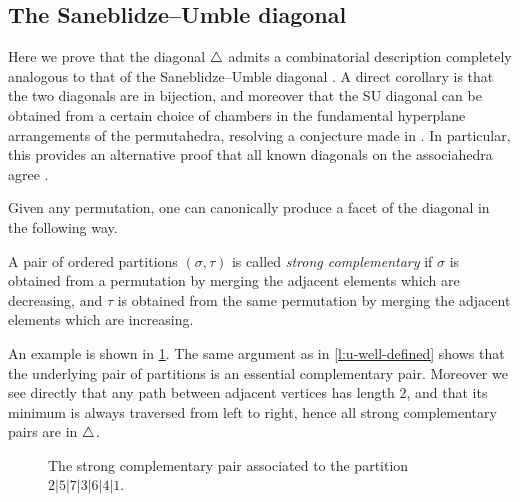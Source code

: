 \subsection{The Saneblidze--Umble diagonal}


Here we prove that the diagonal $\triangle$ admits a combinatorial description completely analogous to that of the Saneblidze--Umble diagonal \cite{SaneblidzeUmble04}. 
A direct corollary is that the two diagonals are in bijection, and moreover that the SU diagonal can be obtained from a certain choice of chambers in the fundamental hyperplane arrangements of the permutahedra, resolving a conjecture made in \cite{LA21}.
In particular, this provides an alternative proof that all known diagonals on the associahedra agree \cite{saneblidzeComparingDiagonalsAssociahedra2022}.

Given any permutation, one can canonically produce a facet of the diagonal in the following way. 

\begin{definition}
    A pair of ordered partitions $(\sigma,\tau)$ is called \emph{strong complementary} if $\sigma$ is obtained from a permutation by merging the adjacent elements which are decreasing, and $\tau$ is obtained from the same permutation by merging the adjacent elements which are increasing.
\end{definition}

An example is shown in \cref{fig:strong-complementary}.
The same argument as in \cref{l:u-well-defined} shows that the underlying pair of partitions is an essential complementary pair. 
Moreover we see directly that any path between adjacent vertices has length $2$, and that its minimum is always traversed from left to right, hence all strong complementary pairs are in $\triangle$. 

\begin{figure}[h!]
\caption{The strong complementary pair associated to the partition $2|5|7|3|6|4|1$.}
\label{fig:strong-complementary}
\end{figure}

